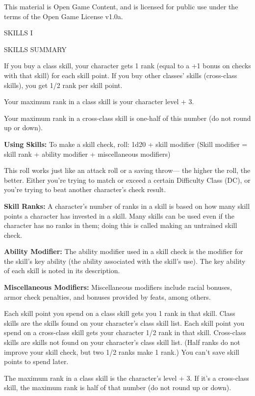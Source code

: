 \documentclass{article}
\begin{document}
This material is Open Game Content, and is licensed for public use under the terms 
of the Open Game License v1.0a.

{\LARGE{}SKILLS I}

\vspace{12pt}
{\LARGE{}SKILLS SUMMARY}

If you buy a class skill, your character gets 1 rank (equal to a +1 bonus on checks 
with that skill) for each skill point. If you buy other classes' skills (cross-class 
skills), you get 1/2 rank per skill point.

Your maximum rank in a class skill is your character level + 3.

Your maximum rank in a cross-class skill is one-half of this number (do not round 
up or down).

\textbf{Using Skills:} To make a skill check, roll: 1d20 + skill modifier (Skill 
modifier = skill rank + ability modifier + miscellaneous modifiers)

This roll works just like an attack roll or a saving throw--- the higher the roll, 
the better. Either you're trying to match or exceed a certain Difficulty Class 
(DC), or you're trying to beat another character's check result.

\textbf{Skill Ranks:} A character's number of ranks in a skill is based on how 
many skill points a character has invested in a skill. Many skills can be used 
even if the character has no ranks in them; doing this is called making an untrained 
skill check.

\textbf{Ability Modifier:} The ability modifier used in a skill check is the modifier 
for the skill's key ability (the ability associated with the skill's use). The 
key ability of each skill is noted in its description.

\textbf{Miscellaneous Modifiers:} Miscellaneous modifiers include racial bonuses, 
armor check penalties, and bonuses provided by feats, among others.

\vspace{12pt}
Each skill point you spend on a class skill gets you 1 rank in that skill. Class 
skills are the skills found on your character's class skill list. Each skill point 
you spend on a cross-class skill gets your character 1/2 rank in that skill. Cross-class 
skills are skills not found on your character's class skill list. (Half ranks do 
not improve your skill check, but two 1/2 ranks make 1 rank.) You can't save skill 
points to spend later.

The maximum rank in a class skill is the character's level + 3. If it's a cross-class 
skill, the maximum rank is half of that number (do not round up or down).
\end{document}
